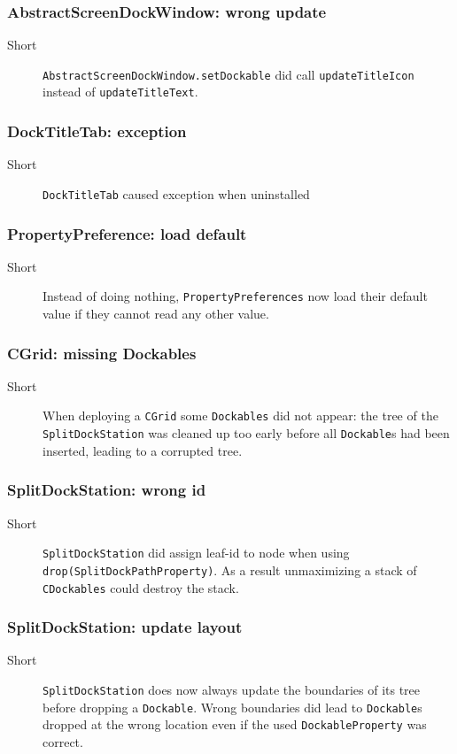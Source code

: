 \documentclass[a4paper,10pt]{article}
\newcommand{\src}[1]{\lstinline[basicstyle=\normalsize\ttfamily,keywordstyle=\normalsize\ttfamily,identifierstyle=\normalsize\ttfamily]|#1|}
\newcommand{\short}{\item[Short]}
\begin{document}
\subsubsection{AbstractScreenDockWindow: wrong update}
\begin{description}
 \short \src{AbstractScreenDockWindow.setDockable} did call \src{updateTitleIcon} instead of \src{updateTitleText}.
\end{description}

\subsubsection{DockTitleTab: exception}
\begin{description}
 \short \src{DockTitleTab} caused exception when uninstalled
\end{description}


\subsubsection{PropertyPreference: load default}
\begin{description}
 \short Instead of doing nothing, \src{PropertyPreferences} now load their default value if they cannot read any other value.
\end{description}

\subsubsection{CGrid: missing Dockables}
\begin{description}
 \short When deploying a \src{CGrid} some \src{Dockables} did not appear: the tree of the \src{SplitDockStation} was cleaned up too early before all \src{Dockable}s had been inserted, leading to a corrupted tree.
\end{description}

\subsubsection{SplitDockStation: wrong id}
\begin{description}
 \short \src{SplitDockStation} did assign leaf-id to node when using \linebreak \src{drop(SplitDockPathProperty)}. As a result unmaximizing a stack of \src{CDockables} could destroy the stack.
\end{description}

\subsubsection{SplitDockStation: update layout}
\begin{description}
 \short \src{SplitDockStation} does now always update the boundaries of its tree before dropping a \src{Dockable}. Wrong boundaries did lead to \src{Dockable}s dropped at the wrong location even if the used \src{DockableProperty} was correct.
\end{description}
\end{document}
